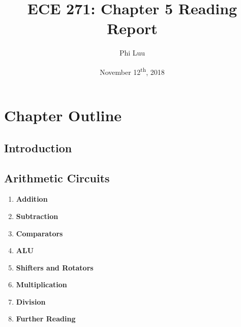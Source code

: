 \documentclass[12pt]{article}
\title{ECE 271: Chapter 5 Reading Report}
\author{Phi Luu}
\date{November 12\textsuperscript{th}, 2018}
\begin{document}
\maketitle

\section{Chapter Outline}

\subsection{Introduction}

\subsection{Arithmetic Circuits}

\begin{enumerate}
  \item \textbf{Addition}

  \item \textbf{Subtraction}

  \item \textbf{Comparators}

  \item \textbf{ALU}

  \item \textbf{Shifters and Rotators}

  \item \textbf{Multiplication}

  \item \textbf{Division}

  \item \textbf{Further Reading}
\end{enumerate}
\end{document}
